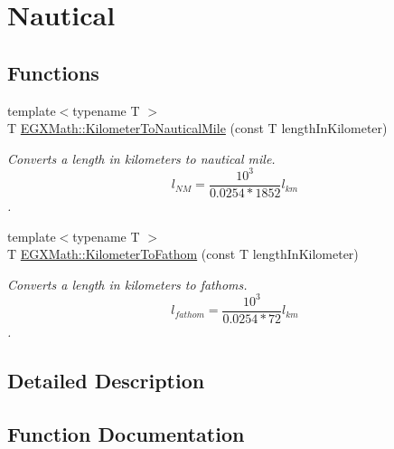 \hypertarget{group___e_g_x_math-_conversions-_length_conversions-_s_i-_kilometer-_nautical}{}\section{Nautical}
\label{group___e_g_x_math-_conversions-_length_conversions-_s_i-_kilometer-_nautical}
\subsection*{Functions}
\begin{DoxyCompactItemize}
\item 
{\footnotesize template$<$typename T $>$ }\\T \mbox{\hyperlink{group___e_g_x_math-_conversions-_length_conversions-_s_i-_kilometer-_nautical_ga4571f464f551ae965f88192b53dd24ff}{E\+G\+X\+Math\+::\+Kilometer\+To\+Nautical\+Mile}} (const T length\+In\+Kilometer)
\begin{DoxyCompactList}\small\item\em Converts a length in kilometers to nautical mile. \[ l_{NM}= \frac{10^{3}}{0.0254 * 1852} l_{km} \]. \end{DoxyCompactList}\item 
{\footnotesize template$<$typename T $>$ }\\T \mbox{\hyperlink{group___e_g_x_math-_conversions-_length_conversions-_s_i-_kilometer-_nautical_gaaecd42afaeaadc41e885dbf49bebae83}{E\+G\+X\+Math\+::\+Kilometer\+To\+Fathom}} (const T length\+In\+Kilometer)
\begin{DoxyCompactList}\small\item\em Converts a length in kilometers to fathoms. \[ l_{fathom}= \frac{10^{3}}{0.0254 * 72} l_{km} \]. \end{DoxyCompactList}\end{DoxyCompactItemize}


\subsection{Detailed Description}


\subsection{Function Documentation}
\mbox{\label{group___e_g_x_math-_conversions-_length_conversions-_s_i-_kilometer-_nautical_gaaecd42afaeaadc41e885dbf49bebae83}} 

